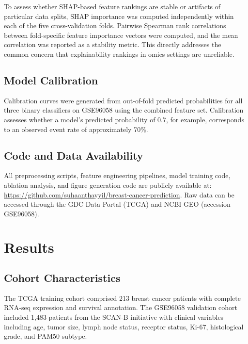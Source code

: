 \documentclass[11pt]{article}
\begin{document}
To assess whether SHAP-based feature rankings are stable or artifacts of particular data splits, SHAP importance was computed independently within each of the five cross-validation folds. Pairwise Spearman rank correlations between fold-specific feature importance vectors were computed, and the mean correlation was reported as a stability metric. This directly addresses the common concern that explainability rankings in omics settings are unreliable.

\subsection{Model Calibration}

Calibration curves were generated from out-of-fold predicted probabilities for all three binary classifiers on GSE96058 using the combined feature set. Calibration assesses whether a model's predicted probability of 0.7, for example, corresponds to an observed event rate of approximately 70\%.

\subsection{Code and Data Availability}

All preprocessing scripts, feature engineering pipelines, model training code, ablation analysis, and figure generation code are publicly available at: \url{https://github.com/suhaanthayyil/breast-cancer-prediction}. Raw data can be accessed through the GDC Data Portal (TCGA) and NCBI GEO (accession GSE96058).


\section{Results}
\label{sec:results}

\subsection{Cohort Characteristics}

The TCGA training cohort comprised 213 breast cancer patients with complete RNA-seq expression and survival annotation. The GSE96058 validation cohort included 1,483 patients from the SCAN-B initiative with clinical variables including age, tumor size, lymph node status, receptor status, Ki-67, histological grade, and PAM50 subtype.
\end{document}
